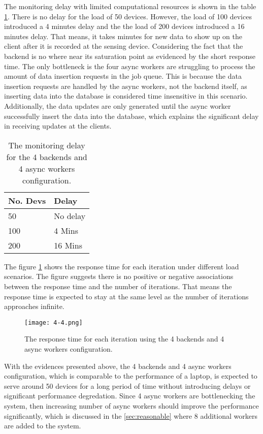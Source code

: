 \documentclass[../thesis.tex]{subfiles}
\begin{document}
The monitoring delay with limited computational resources is shown in the table \ref{tab:delay4-4}. There is no delay for the load of 50 devices. However, the load of 100 devices introduced a 4 minutes delay and the the load of 200 devices introduced a 16 minutes delay. That means, it takes minutes for new data to show up on the client after it is recorded at the sensing device. Considering the fact that the backend is no where near its saturation point as evidenced by the short response time. The only bottleneck is the four async workers are struggling to process the amount of data insertion requests in the job queue. This is because the data insertion requests are handled by the async workers, not the backend itself, as inserting data into the database is considered time insensitive in this scenario. Additionally, the data updates are only generated until the async worker successfully insert the data into the database, which explains the significant delay in receiving updates at the clients. 

\begin{table}[h!]
	\begin{center}
		\caption{The monitoring delay for the 4 backends and 4 async workers configuration.}
		\label{tab:delay4-4}
		\begin{tabular}{l|l}
			\toprule
			\textbf{No. Devs} & \textbf{Delay}\\
			\midrule
			50 & No delay \\
			100 & 4 Mins\\
			200 & 16 Mins\\
			\bottomrule
		\end{tabular}
	\end{center}
\end{table}

The figure \ref{fig:4-4} shows the response time for each iteration under different load scenarios. The figure suggests there is no positive or negative associations between the response time and the number of iterations. That means the response time is expected to stay at the same level as the number of iterations approaches infinite. 

\begin{figure}[!ht]
	\centering
	\texttt{[image: 4-4.png]}
	\caption{The response time for each iteration using the 4 backends and 4 async workers configuration.}
	\label{fig:4-4}
\end{figure}

With the evidences presented above, the 4 backends and 4 async workers configuration, which is comparable to the performance of a laptop, is expected to serve around 50 devices for a long period of time without introducing delays or significant performance degredation. Since 4 async workers are bottlenecking the system, then increasing number of async workers should improve the performance significantly, which is discussed in the \autoref{sec:reasonable} where 8 additional workers are added to the system. 
\end{document}
